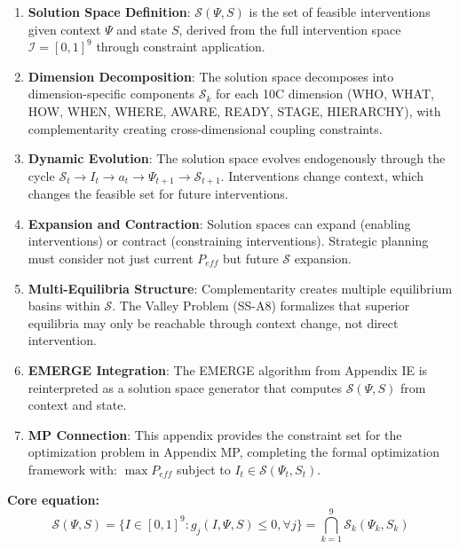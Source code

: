 \begin{enumerate}
    \item \textbf{Solution Space Definition}: $\mathcal{S}(\Psi, S)$ is the set of feasible interventions given context $\Psi$ and state $S$, derived from the full intervention space $\mathcal{I} = [0,1]^9$ through constraint application.

    \item \textbf{Dimension Decomposition}: The solution space decomposes into dimension-specific components $\mathcal{S}_k$ for each 10C dimension (WHO, WHAT, HOW, WHEN, WHERE, AWARE, READY, STAGE, HIERARCHY), with complementarity creating cross-dimensional coupling constraints.

    \item \textbf{Dynamic Evolution}: The solution space evolves endogenously through the cycle $\mathcal{S}_t \to I_t \to a_t \to \Psi_{t+1} \to \mathcal{S}_{t+1}$. Interventions change context, which changes the feasible set for future interventions.

    \item \textbf{Expansion and Contraction}: Solution spaces can expand (enabling interventions) or contract (constraining interventions). Strategic planning must consider not just current $P_{eff}$ but future $\mathcal{S}$ expansion.

    \item \textbf{Multi-Equilibria Structure}: Complementarity creates multiple equilibrium basins within $\mathcal{S}$. The Valley Problem (SS-A8) formalizes that superior equilibria may only be reachable through context change, not direct intervention.

    \item \textbf{EMERGE Integration}: The EMERGE algorithm from Appendix IE is reinterpreted as a solution space generator that computes $\mathcal{S}(\Psi, S)$ from context and state.

    \item \textbf{MP Connection}: This appendix provides the constraint set for the optimization problem in Appendix MP, completing the formal optimization framework with: $\max P_{eff}$ subject to $I_t \in \mathcal{S}(\Psi_t, S_t)$.
\end{enumerate}

\textbf{Core equation:}
\begin{equation}
\mathcal{S}(\Psi, S) = \{I \in [0,1]^9 : g_j(I, \Psi, S) \leq 0, \forall j\} = \bigcap_{k=1}^{9} \mathcal{S}_k(\Psi_k, S_k)
\end{equation}

